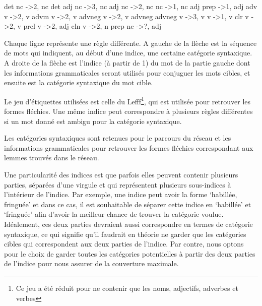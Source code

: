 \documentclass[a4paper, 12pt]{article}
\begin{document}
\begin{framed}
det nc -\textgreater 2, nc\newline
det adj nc -\textgreater 3, nc\newline
adj nc -\textgreater 2, nc\newline
nc -\textgreater 1, nc\newline
adj prep -\textgreater 1, adj\newline
adv v -\textgreater 2, v\newline
advm v -\textgreater 2, v\newline
advneg v -\textgreater 2, v\newline
advneg advneg v -\textgreater 3, v\newline
v -\textgreater 1, v\newline
clr v -\textgreater 2, v\newline
prel v -\textgreater 2, adj \newline
cln v -\textgreater 2, n\newline
prep nc -\textgreater ?, adj
\end{framed}

Chaque ligne représente une règle différente. A gauche de la flèche est la séquence de mots qui indiquent, au début d'une indice, une certaine catégorie syntaxique. A droite de la flèche est l'indice (à partir de 1) du mot de la partie gauche dont les informations grammaticales seront utilisés pour conjuguer les mots cibles, et ensuite est la catégorie syntaxique du mot cible. 

Le jeu d'étiquettes utilisées est celle du Lefff\footnote{Ce jeu a été réduit pour ne contenir que les noms, adjectifs, adverbes et verbes}, qui est utilisée pour retrouver les formes fléchies. Une même indice peut correspondre à plusieurs règles différentes si un mot donné est ambigu pour la catégorie syntaxique.

Les catégories syntaxiques sont retenues pour le parcours du réseau et les informations grammaticales pour retrouver les formes fléchies correspondant aux lemmes trouvés dans le réseau.

Une particularité des indices est que parfois elles peuvent contenir plusieurs parties, séparées d'une virgule et qui représentent plusieurs sous-indices à l'intérieur de l'indice. Par exemple, une indice peut avoir la forme \lq{habillée, fringuée}\rq{} et dans ce cas, il est souhaitable de séparer cette indice en \lq{habillée}\rq{} et \lq{fringuée}\rq{} afin d'avoir la meilleur chance de trouver la catégorie voulue. Idéalement, ces deux parties devraient aussi correspondre en termes de catégorie syntaxique, ce qui signifie qu'il faudrait en théorie ne garder que les catégories cibles qui correspondent aux deux parties de l'indice. Par contre, nous optons pour le choix de garder toutes les catégories potentielles à partir des deux parties de l'indice pour nous assurer de la couverture maximale. 
\end{document}
